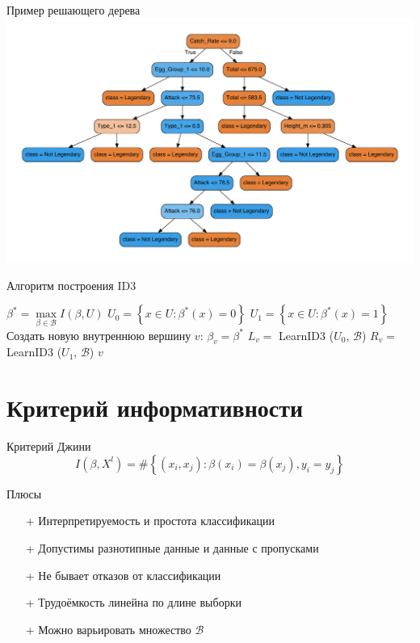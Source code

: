 \documentclass[10pt]{beamer}
\begin{document}
\begin{frame}{Пример решающего дерева}
	  \includegraphics[height=\textheight, width=\textwidth, keepaspectratio = true]{images/pokemons-tree}   
\end{frame}

{
\begin{frame}{Алгоритм построения ID3}
  \begin{algorithmic}[1]
         \State {}
       \EndIf
       \State $\beta^* = \max\limits_{\beta \in \mathscr{B}} I(\beta, U)$
       \State $U_0 = \left\{ x \in U : \beta^*(x) = 0\right\}$	
       \State $U_1 = \left\{ x \in U : \beta^*(x) = 1\right\}$	
         \State {}
       \EndIf
       \State Создать новую внутреннюю вершину $v$: $\beta_v = \beta^*$
       \State $L_v =$ LearnID3 ($U_0$, $\mathscr{B}$)
       \State $R_v =$ LearnID3 ($U_1$, $\mathscr{B}$)
       \State \Return $v$
    \EndFunction
  \end{algorithmic}    
\end{frame}
}

\section{Критерий информативности}

\begin{frame}{Критерий Джини}
  $$I(\beta,X^l)= \# \left\{ (x_i, x_j): \beta(x_i) = \beta(x_j), y_i = y_j \right\}$$
\end{frame}

\begin{frame}{Плюсы}
	\begin{enumerate}[<+- |alert@+>] 
	\item[+] Интерпретируемость и простота классификации
	\item[+] Допустимы разнотипные данные и данные с пропусками
	\item[+] Не бывает отказов от классификации
	\item[+] Трудоёмкость линейна по длине выборки
	\item[+] Можно варьировать множество $\mathscr{B}$
	\end{enumerate}
\end{frame}
\end{document}
